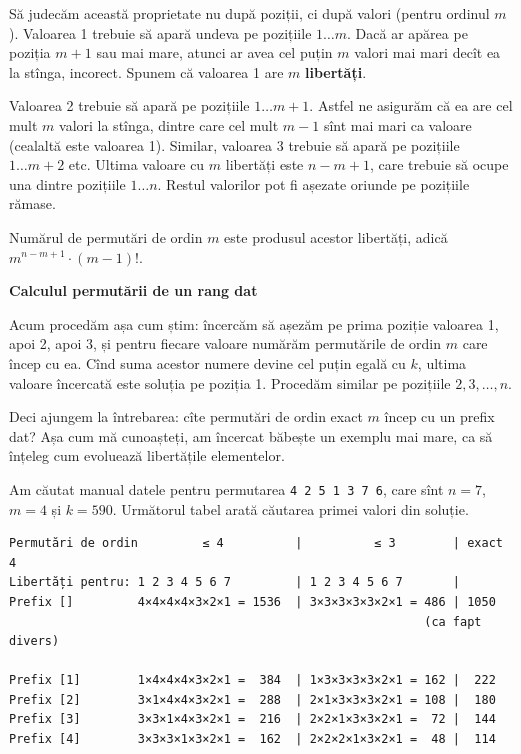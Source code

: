 \documentclass[../main.tex]{subfiles}
\begin{document}
Să judecăm această proprietate nu după poziții, ci după valori (pentru ordinul $m$). Valoarea 1 trebuie să apară undeva pe pozițiile $1 \dots m$. Dacă ar apărea pe poziția $m+1$ sau mai mare, atunci ar avea cel puțin $m$ valori mai mari decît ea la stînga, incorect. Spunem că valoarea 1 are $m$ \textbf{libertăți}.

Valoarea 2 trebuie să apară pe pozițiile $1 \dots m+1$. Astfel ne asigurăm că ea are cel mult $m$ valori la stînga, dintre care cel mult $m-1$ sînt mai mari ca valoare (cealaltă este valoarea 1). Similar, valoarea 3 trebuie să apară pe pozițiile $1 \dots m+2$ etc. Ultima valoare cu $m$ libertăți este $n - m + 1$, care trebuie să ocupe una dintre pozițiile $1 \dots n$. Restul valorilor pot fi așezate oriunde pe pozițiile rămase.

Numărul de permutări de ordin $m$ este produsul acestor libertăți, adică $m^{n - m + 1} \cdot (m-1)!$.

\textbf{Calculul permutării de un rang dat}

Acum procedăm așa cum știm: încercăm să așezăm pe prima poziție valoarea 1, apoi 2, apoi 3, și pentru fiecare valoare numărăm permutările de ordin $m$ care încep cu ea. Cînd suma acestor numere devine cel puțin egală cu $k$, ultima valoare încercată este soluția pe poziția 1. Procedăm similar pe pozițiile $2, 3, \dots, n$.

Deci ajungem la întrebarea: cîte permutări de ordin exact $m$ încep cu un prefix dat? Așa cum mă cunoașteți,  am încercat băbește un exemplu mai mare, ca să înțeleg cum evoluează libertățile elementelor.

Am căutat manual datele pentru permutarea \texttt{4 2 5 1 3 7 6}, care sînt $n = 7$, $m = 4$ și $k=590$. Următorul tabel arată căutarea primei valori din soluție.

\begin{verbatim}
Permutări de ordin         ≤ 4          |          ≤ 3        | exact 4
Libertăți pentru: 1 2 3 4 5 6 7         | 1 2 3 4 5 6 7       |
Prefix []         4×4×4×4×3×2×1 = 1536  | 3×3×3×3×3×2×1 = 486 | 1050
                                                          (ca fapt divers)

Prefix [1]        1×4×4×4×3×2×1 =  384  | 1×3×3×3×3×2×1 = 162 |  222
Prefix [2]        3×1×4×4×3×2×1 =  288  | 2×1×3×3×3×2×1 = 108 |  180
Prefix [3]        3×3×1×4×3×2×1 =  216  | 2×2×1×3×3×2×1 =  72 |  144
Prefix [4]        3×3×3×1×3×2×1 =  162  | 2×2×2×1×3×2×1 =  48 |  114
\end{verbatim}
\end{document}
